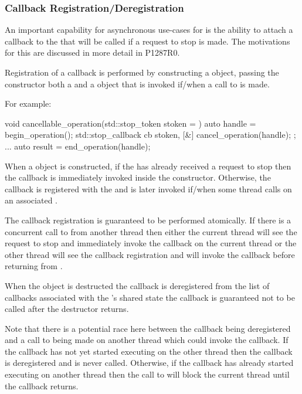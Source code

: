 \subsubsection*{Callback Registration/Deregistration}

An important capability for asynchronous use-cases for  is the ability to attach
a callback to the  that will be called if a request to stop is made. The motivations
for this are discussed in more detail in P1287R0.

Registration of a callback is performed by constructing a  object,
passing the constructor both a  and a  object that
is invoked if/when a call to  is made.

For example:
\begin{codeblock}
void cancellable_operation(std::stop_token stoken = {})
{
  auto handle = begin_operation();
  std::stop_callback cb{ stoken, [&] { cancel_operation(handle); }};
  ...
  auto result = end_operation(handle);
}
\end{codeblock}

When a  object is constructed, if the  has
already received a request to stop then the callback is immediately invoked inside
the constructor. Otherwise, the callback is registered with the 
and is later invoked if/when some thread calls 
on an associated .

The callback registration is guaranteed to be performed atomically. If there is a
concurrent call to  from another thread then either the
current thread will see the request to stop and immediately invoke the callback
on the current thread or the other thread will see the callback registration and
will invoke the callback before returning from .

When the  object is destructed the callback is deregistered
from the list of callbacks associated with the 's shared state
the callback is guaranteed not to be called after the 
destructor returns.

Note that there is a potential race here between the callback being deregistered
and a call to  being made on another thread which could
invoke the callback. If the callback has not yet started executing on the other
thread then the callback is deregistered and is never called. Otherwise, if the
callback has already started executing on another thread then the call to
 will block the current thread until the callback returns.

